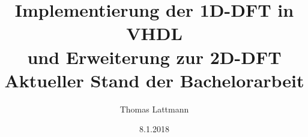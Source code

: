 

\title[Implementierung der 1D-DFT in VHDL und Erweiterung zur 2D-DFT, Aktueller Stand der BA]{\textbf{Implementierung der 1D-DFT in VHDL\\ und Erweiterung zur 2D-DFT}\\ \vspace{1cm} Aktueller Stand der Bachelorarbeit}
\vspace{1cm}
\author[TL]{Thomas Lattmann}
\date[8.1.2018]{8.1.2018} 









\frame{\titlepage}

